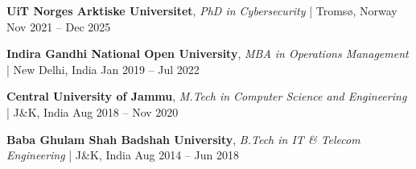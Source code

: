 

\begin{cvhonors}

  \cvhonor
    {{\bf UiT Norges Arktiske Universitet}, \textit{PhD in Cybersecurity} | Tromsø, Norway}
    {Nov 2021 -- Dec 2025}

  \cvhonor
    {{\bf Indira Gandhi National Open University}, \textit{MBA in Operations Management} | New Delhi, India}
    {Jan 2019 -- Jul 2022}

  \cvhonor
    {{\bf Central University of Jammu}, \textit{M.Tech in Computer Science and Engineering} | J\&K, India}
    {Aug 2018 -- Nov 2020}

  \cvhonor
    {{\bf Baba Ghulam Shah Badshah University}, \textit{B.Tech in IT \& Telecom Engineering} | J\&K, India}
    {Aug 2014 -- Jun 2018}
\end{cvhonors}



